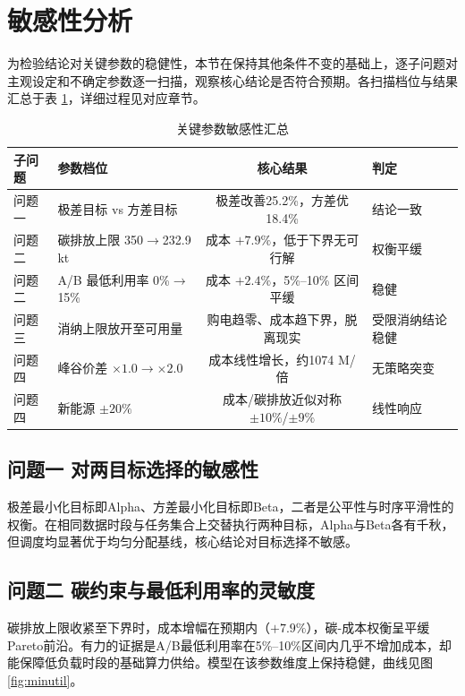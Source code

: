 \section{敏感性分析}

为检验结论对关键参数的稳健性，本节在保持其他条件不变的基础上，逐子问题对主观设定和不确定参数逐一扫描，观察核心结论是否符合预期。各扫描档位与结果汇总于表 \ref{tab:sensitivity}，详细过程见对应章节。

\begin{table}[htbp]
\centering
\caption{关键参数敏感性汇总}
\label{tab:sensitivity}
\begin{tabular}{llcl}
\toprule
子问题 & 参数档位 & 核心结果 & 判定 \\
\midrule
问题一 & 极差目标 vs 方差目标 & 极差改善25.2\%，方差优18.4\% & 结论一致 \\
问题二 & 碳排放上限 350$\to$232.9 kt & 成本 $+7.9\%$，低于下界无可行解 & 权衡平缓 \\
问题二 & A/B 最低利用率 0\%$\to$15\% & 成本 $+2.4\%$，5\%--10\% 区间平缓 & 稳健 \\
问题三 & 消纳上限放开至可用量 & 购电趋零、成本趋下界，脱离现实 & 受限消纳结论稳健 \\
问题四 & 峰谷价差 $\times1.0\to\times2.0$ & 成本线性增长，约1074 M/倍 & 无策略突变 \\
问题四 & 新能源 $\pm20\%$ & 成本/碳排放近似对称 $\pm10\%$/$\pm9\%$ & 线性响应 \\
\bottomrule
\end{tabular}
\end{table}

\subsection{问题一 对两目标选择的敏感性}

极差最小化目标即Alpha、方差最小化目标即Beta，二者是公平性与时序平滑性的权衡。在相同数据时段与任务集合上交替执行两种目标，Alpha与Beta各有千秋，但调度均显著优于均匀分配基线，核心结论对目标选择不敏感。

\subsection{问题二 碳约束与最低利用率的灵敏度}

碳排放上限收紧至下界时，成本增幅在预期内（$+7.9\%$），碳-成本权衡呈平缓Pareto前沿。有力的证据是A/B最低利用率在5\%--10\%区间内几乎不增加成本，却能保障低负载时段的基础算力供给。模型在该参数维度上保持稳健，曲线见图 \ref{fig:minutil}。

